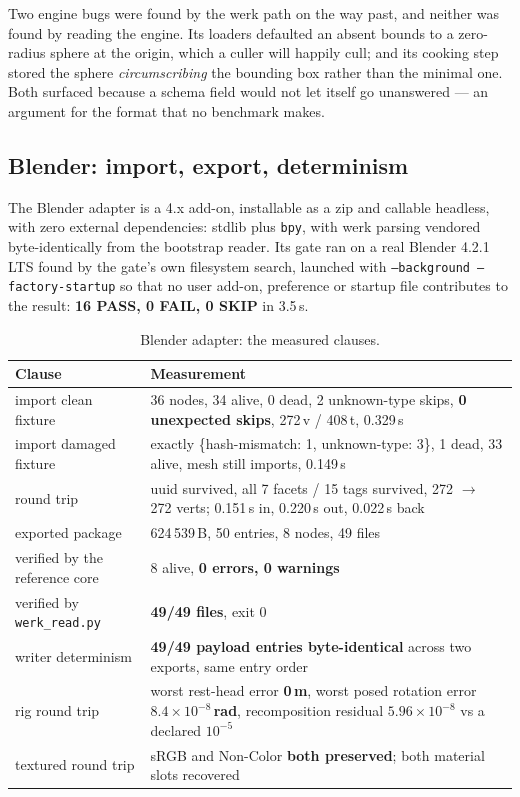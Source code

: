 \documentclass[10pt,twocolumn,letterpaper]{article}
\newcommand{\code}[1]{\texttt{\small #1}}
\begin{document}
Two engine bugs were found by the werk path on the way past, and neither was found
by reading the engine. Its loaders defaulted an absent bounds to a zero-radius
sphere at the origin, which a culler will happily cull; and its cooking step
stored the sphere \emph{circumscribing} the bounding box rather than the minimal
one. Both surfaced because a schema field would not let itself go unanswered ---
an argument for the format that no benchmark makes.

\subsection{Blender: import, export, determinism}

The Blender adapter is a 4.x add-on, installable as a zip and callable headless,
with zero external dependencies: stdlib plus \code{bpy}, with werk parsing
vendored byte-identically from the bootstrap reader. Its gate ran on a real
Blender 4.2.1 LTS found by the gate's own filesystem search, launched with
\code{--background --factory-startup} so that no user add-on, preference or
startup file contributes to the result: \textbf{16 PASS, 0 FAIL, 0 SKIP} in
3.5\,s.

\begin{table}[t]
\caption{Blender adapter: the measured clauses.}
\label{tab:blender}
\small
\begin{tabular}{@{}L{2.9cm}L{4.3cm}@{}}
\toprule
Clause & Measurement \\
\midrule
import clean fixture & 36 nodes, 34 alive, 0 dead, 2 unknown-type skips, \textbf{0 unexpected skips}, 272\,v / 408\,t, 0.329\,s \\
import damaged fixture & exactly \{hash-mismatch: 1, unknown-type: 3\}, 1 dead, 33 alive, mesh still imports, 0.149\,s \\
round trip & uuid survived, all 7 facets / 15 tags survived, 272 $\rightarrow$ 272 verts; 0.151\,s in, 0.220\,s out, 0.022\,s back \\
exported package & 624\,539\,B, 50 entries, 8 nodes, 49 files \\
verified by the reference core & 8 alive, \textbf{0 errors, 0 warnings} \\
verified by \code{werk\_read.py} & \textbf{49/49 files}, exit 0 \\
writer determinism & \textbf{49/49 payload entries byte-identical} across two exports, same entry order \\
rig round trip & worst rest-head error \textbf{0\,m}, worst posed rotation error \textbf{$8.4\times10^{-8}$\,rad}, recomposition residual $5.96\times10^{-8}$ vs a declared $10^{-5}$ \\
textured round trip & sRGB and Non-Color \textbf{both preserved}; both material slots recovered \\
\bottomrule
\end{tabular}
\end{table}
\end{document}
